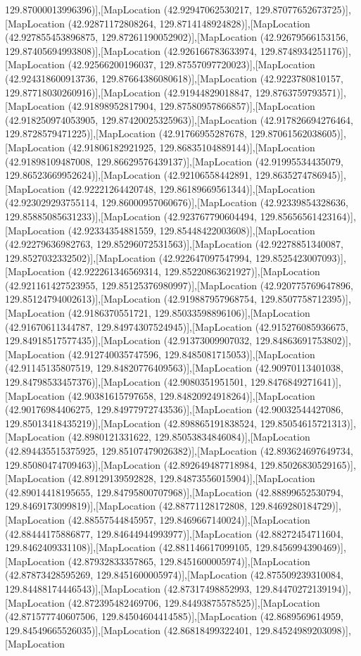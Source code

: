 129.87000013996396)],[MapLocation (42.92947062530217, 129.87077652673725)],[MapLocation (42.92871172808264, 129.8714148924828)],[MapLocation (42.927855453896875, 129.87261190052902)],[MapLocation (42.92679566153156, 129.87405694993808)],[MapLocation (42.926166783633974, 129.8748934251176)],[MapLocation (42.92566200196037, 129.87557097720023)],[MapLocation (42.924318600913736, 129.87664386080618)],[MapLocation (42.9223780810157, 129.87718030260916)],[MapLocation (42.91944829018847, 129.8763759793571)],[MapLocation (42.91898952817904, 129.87580957866857)],[MapLocation (42.918250974053905, 129.87420025325963)],[MapLocation (42.917826694276464, 129.8728579471225)],[MapLocation (42.91766955287678, 129.87061562038605)],[MapLocation (42.91806182921925, 129.86835104889144)],[MapLocation (42.91898109487008, 129.86629576439137)],[MapLocation (42.91995534435079, 129.86523669952624)],[MapLocation (42.92106558442891, 129.8635274786945)],[MapLocation (42.92221264420748, 129.86189669561344)],[MapLocation (42.923029293755114, 129.86000957060676)],[MapLocation (42.92339854328636, 129.85885085631233)],[MapLocation (42.923767790604494, 129.85656561423164)],[MapLocation (42.92334354881559, 129.85448422003608)],[MapLocation (42.92279636982763, 129.85296072531563)],[MapLocation (42.92278851340087, 129.8527032332502)],[MapLocation (42.922647097547994, 129.8525423007093)],[MapLocation (42.922261346569314, 129.85220863621927)],[MapLocation (42.921161427523955, 129.85125376980997)],[MapLocation (42.920775769647896, 129.85124794002613)],[MapLocation (42.919887957968754, 129.8507758712395)],[MapLocation (42.9186370551721, 129.85033598896106)],[MapLocation (42.91670611344787, 129.84974307524945)],[MapLocation (42.915276085936675, 129.84918517577435)],[MapLocation (42.91373009907032, 129.84863691753802)],[MapLocation (42.912740035747596, 129.8485081715053)],[MapLocation (42.91145135807519, 129.84820776409563)],[MapLocation (42.90970113401038, 129.84798533457376)],[MapLocation (42.9080351951501, 129.8476849271641)],[MapLocation (42.90381615797658, 129.84820924918264)],[MapLocation (42.90176984406275, 129.84977972743536)],[MapLocation (42.90032544427086, 129.85013418435219)],[MapLocation (42.898865191838524, 129.85054615721313)],[MapLocation (42.8980121331622, 129.85053834846084)],[MapLocation (42.894435515375925, 129.85107479026382)],[MapLocation (42.893624697649734, 129.85080474709463)],[MapLocation (42.892649487718984, 129.85026830529165)],[MapLocation (42.89129139592828, 129.84873556015904)],[MapLocation (42.89014418195655, 129.84795800707968)],[MapLocation (42.88899652530794, 129.8469173099819)],[MapLocation (42.88771128172808, 129.8469280184729)],[MapLocation (42.88557544845957, 129.8469667140024)],[MapLocation (42.88444175886877, 129.84644944993977)],[MapLocation (42.88272454711604, 129.8462409331108)],[MapLocation (42.881146617099105, 129.8456994390469)],[MapLocation (42.87932833357865, 129.8451600005974)],[MapLocation (42.87873428595269, 129.8451600005974)],[MapLocation (42.875509239310084, 129.84488174446543)],[MapLocation (42.87317498852993, 129.84470272139194)],[MapLocation (42.872395482469706, 129.84493875578525)],[MapLocation (42.871577740607506, 129.84504604414585)],[MapLocation (42.8689569614959, 129.84549665526035)],[MapLocation (42.86818499322401, 129.84524989203098)],[MapLocation 